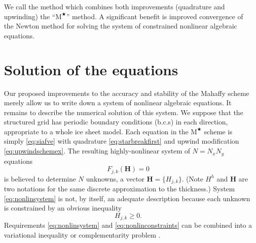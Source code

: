 \documentclass[twocolumn,letterpaper]{igs}
\newcommand\bH{\mathbf{H}}
\newcommand{\Mstar}{$\text{M}^{\bigstar}$\xspace}
\begin{document}
We call the method which combines both improvements (quadrature and upwinding) the ``\Mstar'' method.  A significant benefit is improved convergence of the Newton method for solving the system of constrained nonlinear algebraic equations.


\section{Solution of the equations} \label{sec:solution}

Our proposed improvements to the accuracy and stability of the Mahaffy scheme merely allow us to write down a system of nonlinear algebraic equations.  It remains to describe the numerical solution of this system.  We suppose that the structured grid has periodic boundary conditions (b.c.s) in each direction, appropriate to a whole ice sheet model.  Each equation in the \Mstar scheme is simply \eqref{eq:siafve} with quadrature \eqref{eq:starbreakfirst} and upwind modification \eqref{eq:upwindschemex}.  The resulting highly-nonlinear system of $N=N_x N_y$ equations
\begin{equation}
F_{j,k}(\bH) = 0   \label{eq:nonlinsystem}
\end{equation}
is believed to determine $N$ unknowns, a vector $\bH=\{H_{j,k}\}$.  (Note $H^h$ and $\bH$ are two notations for the same discrete approximation to the thickness.)  System \eqref{eq:nonlinsystem} is not, by itself, an adequate description because each unknown is constrained by an obvious inequality
\begin{equation}
H_{j,k} \ge 0.  \label{eq:nonlinconstraints}
\end{equation}
Requirements \eqref{eq:nonlinsystem} and \eqref{eq:nonlinconstraints} can be combined into a variational inequality \citep{JouvetBueler2012,KinderlehrerStampacchia1980} or complementarity problem \citep{BensonMunson2006}.
\end{document}
